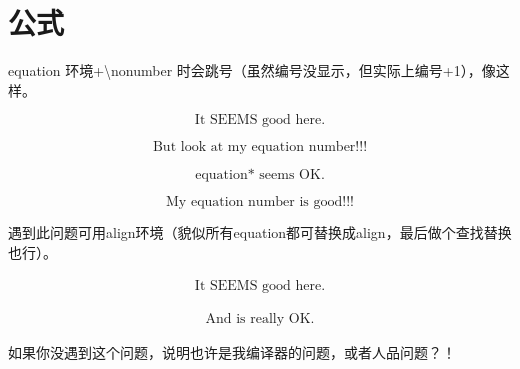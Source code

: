 
\chapter{公式}
\label{cha:3}

equation 环境+\textbackslash nonumber 时会跳号（虽然编号没显示，但实际上编号+1），像这样。


\begin{equation}
{\text{It SEEMS good here.}} \nonumber
\end{equation}

\begin{equation}
{\text{But look at my equation number!!!}}
\end{equation}

\begin{equation*}
{\text{equation* seems OK.}} \nonumber
\end{equation*}

\begin{equation}
{\text{My equation number is good!!!}}
\end{equation}






遇到此问题可用align环境（貌似所有equation都可替换成align，最后做个查找替换也行）。


\begin{align}
{\text{It SEEMS good here.}} \nonumber
\end{align}

\begin{align}
{\text{And is really OK.}}
\end{align}




如果你没遇到这个问题，说明也许是我编译器的问题，或者人品问题？！


